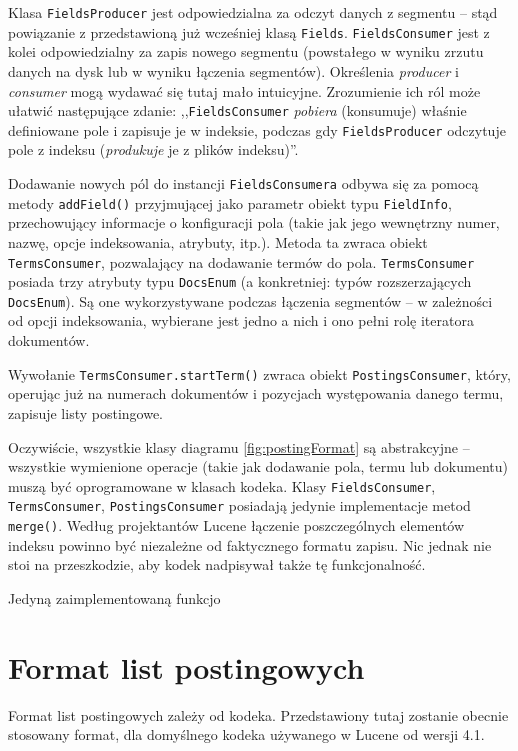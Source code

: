 Klasa \texttt{FieldsProducer} jest odpowiedzialna za odczyt danych z segmentu -- stąd powiązanie z przedstawioną już wcześniej klasą \texttt{Fields}. \texttt{FieldsConsumer} jest z kolei odpowiedzialny za zapis nowego segmentu (powstałego w wyniku zrzutu danych na dysk lub w wyniku łączenia segmentów). Określenia \emph{producer} i \emph{consumer} mogą wydawać się tutaj mało intuicyjne. Zrozumienie ich ról może ułatwić następujące zdanie: ,,\texttt{FieldsConsumer} \emph{pobiera} (konsumuje) właśnie definiowane pole i zapisuje je w indeksie, podczas gdy \texttt{FieldsProducer} odczytuje pole z indeksu (\emph{produkuje} je z plików indeksu)''.

Dodawanie nowych pól do instancji \texttt{FieldsConsumera} odbywa się za pomocą metody \texttt{addField()} przyjmującej jako parametr obiekt typu \texttt{FieldInfo}, przechowujący informacje o konfiguracji pola (takie jak jego wewnętrzny numer, nazwę, opcje indeksowania, atrybuty, itp.). Metoda ta zwraca obiekt \texttt{TermsConsumer}, pozwalający na dodawanie termów do pola. \texttt{TermsConsumer} posiada trzy atrybuty typu \texttt{DocsEnum} (a konkretniej: typów rozszerzających \texttt{DocsEnum}). Są one wykorzystywane podczas łączenia segmentów -- w zależności od opcji indeksowania, wybierane jest jedno a nich i ono pełni rolę iteratora dokumentów.

Wywołanie \texttt{TermsConsumer.startTerm()} zwraca obiekt \texttt{PostingsConsumer}, który, operując już na numerach dokumentów i pozycjach występowania danego termu, zapisuje listy postingowe.

Oczywiście, wszystkie klasy diagramu \ref{fig:postingFormat} są abstrakcyjne -- wszystkie wymienione operacje (takie jak dodawanie pola, termu lub dokumentu) muszą być oprogramowane w klasach kodeka. Klasy \texttt{FieldsConsumer}, \texttt{TermsConsumer}, \texttt{PostingsConsumer} posiadają jedynie implementacje metod \texttt{merge()}. Według projektantów Lucene łączenie poszczególnych elementów indeksu powinno być niezależne od faktycznego formatu zapisu. Nic jednak nie stoi na przeszkodzie, aby kodek nadpisywał także tę funkcjonalność.

Jedyną zaimplementowaną funkcjo

\section{Format list postingowych}

Format list postingowych zależy od kodeka. Przedstawiony tutaj zostanie obecnie stosowany format, dla domyślnego kodeka używanego w Lucene od wersji 4.1.

